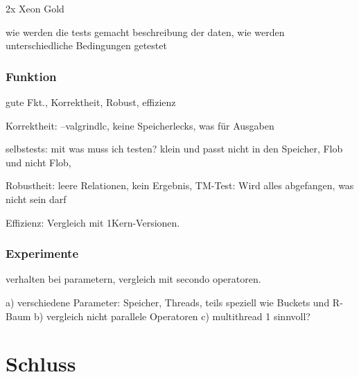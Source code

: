 \documentclass[a4paper,12pt,twoside]{article}
\begin{document}
2x Xeon Gold 

wie werden die tests gemacht
beschreibung der daten, wie werden unterschiedliche Bedingungen getestet

\subsubsection{Funktion}
gute Fkt., Korrektheit, Robust, effizienz

Korrektheit:
--valgrindlc, keine Speicherlecks, was für Ausgaben

selbstests: mit was muss ich testen? klein und passt nicht in den Speicher, Flob und nicht Flob, 

Robustheit: leere Relationen, kein Ergebnis, TM-Test: Wird alles abgefangen, was nicht sein darf

Effizienz: Vergleich mit 1Kern-Versionen.


\subsubsection{Experimente}
verhalten bei parametern, vergleich mit secondo operatoren.

a) verschiedene Parameter: Speicher, Threads, teils speziell wie Buckets und R-Baum 
b) vergleich nicht parallele Operatoren
c) multithread 1 sinnvoll?

\section{Schluss}

\pagebreak 
\printbibliography
\end{document}
